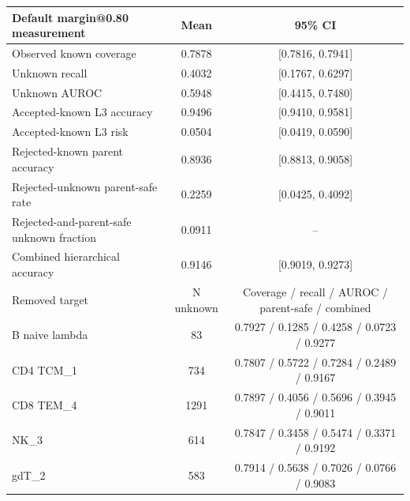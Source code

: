 \begin{tabular}{lcc}
\toprule
Default margin@0.80 measurement & Mean & 95\% CI \\
\midrule
Observed known coverage & 0.7878 & [0.7816, 0.7941] \\
Unknown recall & 0.4032 & [0.1767, 0.6297] \\
Unknown AUROC & 0.5948 & [0.4415, 0.7480] \\
Accepted-known L3 accuracy & 0.9496 & [0.9410, 0.9581] \\
Accepted-known L3 risk & 0.0504 & [0.0419, 0.0590] \\
Rejected-known parent accuracy & 0.8936 & [0.8813, 0.9058] \\
Rejected-unknown parent-safe rate & 0.2259 & [0.0425, 0.4092] \\
Rejected-and-parent-safe unknown fraction & 0.0911 & -- \\
Combined hierarchical accuracy & 0.9146 & [0.9019, 0.9273] \\
\midrule
Removed target & N unknown & Coverage / recall / AUROC / parent-safe / combined \\
B naive lambda & 83 & 0.7927 / 0.1285 / 0.4258 / 0.0723 / 0.9277 \\
CD4 TCM\_1 & 734 & 0.7807 / 0.5722 / 0.7284 / 0.2489 / 0.9167 \\
CD8 TEM\_4 & 1291 & 0.7897 / 0.4056 / 0.5696 / 0.3945 / 0.9011 \\
NK\_3 & 614 & 0.7847 / 0.3458 / 0.5474 / 0.3371 / 0.9192 \\
gdT\_2 & 583 & 0.7914 / 0.5638 / 0.7026 / 0.0766 / 0.9083 \\
\bottomrule
\end{tabular}
